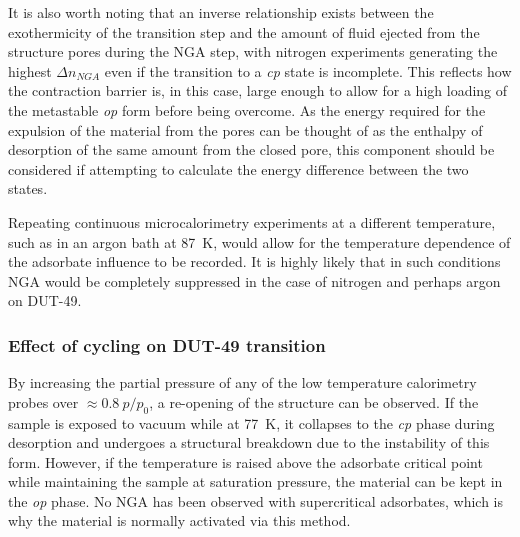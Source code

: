 It is also worth noting that an inverse relationship exists 
between the exothermicity of the transition step and the 
amount of fluid ejected from the structure pores during the \gls{NGA} 
step, with nitrogen experiments generating the highest \(\Delta n_{NGA}\)
even if the transition to a \textit{cp} state is incomplete.
This reflects how the contraction barrier is, in this case, large enough 
to allow for a high loading of the metastable \textit{op} form
before being overcome.
As the energy required for the expulsion of the material from the 
pores can be thought of as the enthalpy of desorption of the same amount
from the closed pore, this component should be considered if 
attempting to calculate the energy difference between the two states.

Repeating continuous microcalorimetry experiments at a different 
temperature, such as in an argon bath at \SI{87}{\kelvin}, would 
allow for the temperature dependence of the adsorbate influence 
to be recorded. It is highly likely that in such conditions 
\gls{NGA} would be completely suppressed in the case of nitrogen 
and perhaps argon on DUT-49.

\subsubsection{Effect of cycling on DUT-49 transition}

By increasing the partial pressure of any of the low temperature 
calorimetry probes over \(\approx 0.8~p/p_0\), a re-opening
of the structure can be observed. If the sample is exposed to 
vacuum while at \SI{77}{\kelvin}, it collapses to the \textit{cp}
phase during desorption and undergoes a structural breakdown 
due to the instability of this form. However, if the temperature 
is raised above the adsorbate critical point while maintaining the
sample at saturation pressure, the material can be kept in the 
\textit{op} phase. No \gls{NGA} has been observed with supercritical 
adsorbates, which is why the material is normally activated via
this method. 


